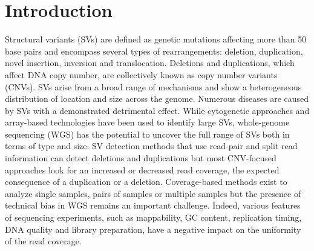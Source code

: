 \section{Introduction}
Structural variants (SVs) are defined as genetic mutations affecting more than 50 base pairs and encompass several types of rearrangements: deletion, duplication, novel insertion, inversion and translocation.
Deletions and duplications, which affect DNA copy number, are collectively known as copy number variants (CNVs).
SVs arise from a broad range of mechanisms and show a heterogeneous distribution of location and size across the genome\cite{Hall2012,Sharp2006,Mills2011}.
Numerous diseases are caused by SVs with a demonstrated detrimental effect\cite{Conrad2010,Spielmann2013}.
While cytogenetic approaches and array-based technologies have been used to identify large SVs, whole-genome sequencing (WGS) has the potential to uncover the full range of SVs both in terms of type and size\cite{Zhao2013a,Pirooznia2015}.
SV detection methods that use read-pair and split read information\cite{Layer2012} can detect deletions and duplications but most CNV-focused approaches look for an increased or decreased read coverage, the expected consequence of a duplication or a deletion.
Coverage-based methods exist to analyze single samples\cite{Abyzov2011}, pairs of samples\cite{Boeva2011} or multiple samples\cite{Handsaker2015,Klambauer2012,Glusman2015} but the presence of technical bias in WGS remains an important challenge.
Indeed, various features of sequencing experiments, such as mappability\cite{Treangen2011,Teo2012}, GC content\cite{Benjamini2012}, replication timing\cite{Koren2014}, DNA quality and library preparation\cite{VanDijk2014}, have a negative impact on the uniformity of the read coverage\cite{Cheung2011}.

